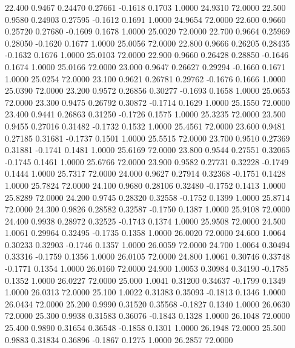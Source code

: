   22.400   0.9467   0.24470   0.27661  -0.1618   0.1703   1.0000  24.9310  72.0000
  22.500   0.9580   0.24903   0.27595  -0.1612   0.1691   1.0000  24.9654  72.0000
  22.600   0.9660   0.25720   0.27680  -0.1609   0.1678   1.0000  25.0020  72.0000
  22.700   0.9664   0.25969   0.28050  -0.1620   0.1677   1.0000  25.0056  72.0000
  22.800   0.9666   0.26205   0.28435  -0.1632   0.1676   1.0000  25.0103  72.0000
  22.900   0.9660   0.26428   0.28850  -0.1646   0.1674   1.0000  25.0166  72.0000
  23.000   0.9647   0.26627   0.29294  -0.1660   0.1671   1.0000  25.0254  72.0000
  23.100   0.9621   0.26781   0.29762  -0.1676   0.1666   1.0000  25.0390  72.0000
  23.200   0.9572   0.26856   0.30277  -0.1693   0.1658   1.0000  25.0653  72.0000
  23.300   0.9475   0.26792   0.30872  -0.1714   0.1629   1.0000  25.1550  72.0000
  23.400   0.9441   0.26863   0.31250  -0.1726   0.1575   1.0000  25.3235  72.0000
  23.500   0.9455   0.27016   0.31482  -0.1732   0.1532   1.0000  25.4561  72.0000
  23.600   0.9481   0.27185   0.31681  -0.1737   0.1501   1.0000  25.5515  72.0000
  23.700   0.9510   0.27369   0.31881  -0.1741   0.1481   1.0000  25.6169  72.0000
  23.800   0.9544   0.27551   0.32065  -0.1745   0.1461   1.0000  25.6766  72.0000
  23.900   0.9582   0.27731   0.32228  -0.1749   0.1444   1.0000  25.7317  72.0000
  24.000   0.9627   0.27914   0.32368  -0.1751   0.1428   1.0000  25.7824  72.0000
  24.100   0.9680   0.28106   0.32480  -0.1752   0.1413   1.0000  25.8289  72.0000
  24.200   0.9745   0.28320   0.32558  -0.1752   0.1399   1.0000  25.8714  72.0000
  24.300   0.9826   0.28582   0.32587  -0.1750   0.1387   1.0000  25.9108  72.0000
  24.400   0.9938   0.28972   0.32525  -0.1743   0.1374   1.0000  25.9508  72.0000
  24.500   1.0061   0.29964   0.32495  -0.1735   0.1358   1.0000  26.0020  72.0000
  24.600   1.0064   0.30233   0.32903  -0.1746   0.1357   1.0000  26.0059  72.0000
  24.700   1.0064   0.30494   0.33316  -0.1759   0.1356   1.0000  26.0105  72.0000
  24.800   1.0061   0.30746   0.33748  -0.1771   0.1354   1.0000  26.0160  72.0000
  24.900   1.0053   0.30984   0.34190  -0.1785   0.1352   1.0000  26.0227  72.0000
  25.000   1.0041   0.31200   0.34637  -0.1799   0.1349   1.0000  26.0313  72.0000
  25.100   1.0022   0.31383   0.35093  -0.1813   0.1346   1.0000  26.0434  72.0000
  25.200   0.9990   0.31520   0.35568  -0.1827   0.1340   1.0000  26.0630  72.0000
  25.300   0.9938   0.31583   0.36076  -0.1843   0.1328   1.0000  26.1048  72.0000
  25.400   0.9890   0.31654   0.36548  -0.1858   0.1301   1.0000  26.1948  72.0000
  25.500   0.9883   0.31834   0.36896  -0.1867   0.1275   1.0000  26.2857  72.0000
